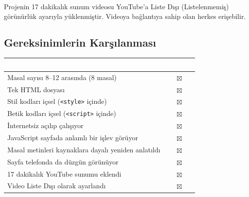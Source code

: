 \documentclass[12pt,a4paper]{article}
\begin{document}
Projenin 17 dakikalık sunum videosu YouTube'a Liste Dışı (Listelenmemiş) görünürlük ayarıyla yüklenmiştir. Videoya bağlantıya sahip olan herkes erişebilir.

\subsection{Gereksinimlerin Karşılanması}
\begin{center}
\begin{tabular}{@{}p{10.5cm}c@{}}
\toprule
\rowcolor{ana}
\textcolor{white}{\textbf{Gereksinim}} & \textcolor{white}{\textbf{Durum}}\\
\midrule
Masal sayısı 8--12 arasında (8 masal) & $\boxtimes$\\
Tek HTML dosyası & $\boxtimes$\\
Stil kodları içsel (\texttt{<style>} içinde) & $\boxtimes$\\
Betik kodları içsel (\texttt{<script>} içinde) & $\boxtimes$\\
İnternetsiz açılıp çalışıyor & $\boxtimes$\\
JavaScript sayfada anlamlı bir işlev görüyor & $\boxtimes$\\
Masal metinleri kaynaklara dayalı yeniden anlatıldı & $\boxtimes$\\
Sayfa telefonda da düzgün görünüyor & $\boxtimes$\\
17 dakikalık YouTube sunumu eklendi & $\boxtimes$\\
Video Liste Dışı olarak ayarlandı & $\boxtimes$\\
\bottomrule
\end{tabular}
\end{center}
\end{document}
